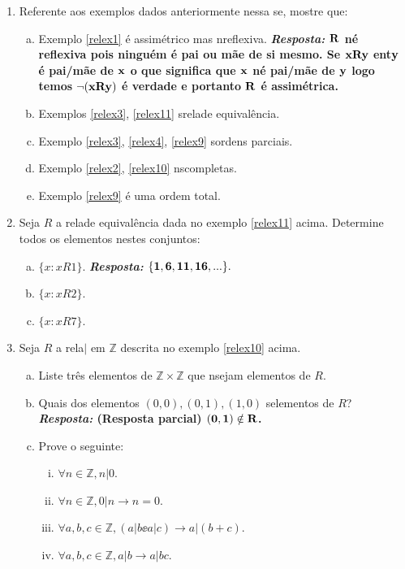 \begin{enumerate}[{\bf 1.}]
\item Referente aos exemplos dados anteriormente nessa se\caoi, mostre que:
\begin{enumerate}[a)]
\item Exemplo \ref{relex1} \'e assim\'etrico mas n\ao reflexiva. {\bf{\it Resposta:} ${\bf R}$ n\ao \'e reflexiva pois ningu\'em \'e pai ou m\~ae de si mesmo. Se ${\bf xRy}$ ent\ao ${\bf y}$  \'e pai/m\~ae de ${\bf x}$ o que significa que ${\bf x}$ n\ao \'e pai/m\~ae de ${\bf y}$ logo temos ${\bf \lnot(xRy)}$ \'e verdade e portanto ${\bf R}$ \'e assim\'etrica.} 
\item Exemplos \ref{relex3}, \ref{relex11} s\ao rela\coes de equival\^encia.
\item Exemplo \ref{relex3}, \ref{relex4}, \ref{relex9} s\ao ordens parciais.
\item Exemplo \ref{relex2}, \ref{relex10} n\ao s\ao completas.
\item Exemplo \ref{relex9} \'e uma ordem total.
\end{enumerate}

\item Seja $R$ a rela\cao de equival\^encia dada no exemplo \ref{relex11} acima. Determine todos os elementos nestes conjuntos:
\begin{enumerate}[a)]
\item $\{x:xR1\}$. {\bf{\it Resposta:} ${\bf \{1,6,11,16,...\}}.$}
\item $\{x:xR2\}$.
\item $\{x:xR7\}$.
\end{enumerate}

\item Seja $R$ a rela\cao $|$ em $\mathbb{Z}$ descrita no exemplo \ref{relex10} acima.
\begin{enumerate}[a)]
\item Liste tr\^es elementos de $\mathbb{Z}\times\mathbb{Z}$ que n\ao sejam elementos de $R$.
\item Quais dos elementos $(0,0),(0,1),(1,0)$ s\ao elementos de $R$? {\bf{\it Resposta:} (Resposta parcial) ${\bf (0,1)\notin R}$.}
\item Prove o seguinte:
\begin{enumerate}[i)]
\item $\forall n\in \mathbb{Z}, n|0$.
\item $\forall n\in \mathbb{Z}, 0|n\to n=0$. 
\item $\forall a,b,c\in \mathbb{Z}, (a|b\ee a|c)\to a|(b+c)$.
\item $\forall a,b,c\in \mathbb{Z}, a|b\to a|bc$.
\end{enumerate}
\end{enumerate}


\end{enumerate}
